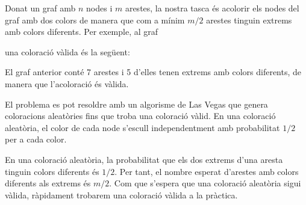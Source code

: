 Donat un graf amb $n$ nodes i $m$ arestes, la nostra tasca és acolorir
els nodes del graf amb dos colors de manera que com a mínim $m/2$
arestes tinguin extrems amb colors diferents. Per exemple, al graf
\begin{center}
\end{center}
una coloració vàlida és la següent:
\begin{center}
\end{center}
El graf anterior conté 7 arestes i 5 d'elles tenen extrems amb colors
diferents, de manera que l'acoloració és vàlida.

El problema es pot resoldre amb un algorisme de Las Vegas que genera
coloracions aleatòries fins que troba una coloració vàlid. En una
coloració aleatòria, el color de cada node s'escull independentment
amb probabilitat $1/2$ per a cada color.

En una coloració aleatòria, la probabilitat que els dos extrems d'una
aresta tinguin colors diferents és $1/2$. Per tant, el nombre esperat
d'arestes amb colors diferents als extrems és $m/2$. Com que s'espera
que una coloració aleatòria sigui vàlida, ràpidament trobarem una
coloració vàlida a la pràctica.

